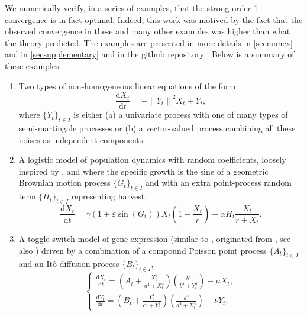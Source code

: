 \documentclass[reqno,12pt]{amsart}
\theoremstyle{plain} %
\theoremstyle{definition} %
\begin{document}
We numerically verify, in a series of examples, that the strong order 1 convergence is in fact optimal. Indeed, this work was motived by the fact that the observed convergence in these and many other examples was higher than what the theory predicted. The examples are presented in more details in \cref{secnumex} and in \cref{secsupplementary} and in the github repository \cite{RODEConvEM2023}. Below is a summary of these examples:
\begin{enumerate}
    \item Two types of non-homogeneous linear equations of the form
    \begin{equation}
        \label{allnoisesRODEsystemintro}
        \frac{\mathrm{d}X_t}{\mathrm{d} t} = - \left\|Y_t\right\|^2 X_t + Y_t,
    \end{equation} 
    where $\{Y_t\}_{t\in I}$ is either (a) a univariate process with one of many types of semi-martingale processes or (b) a vector-valued process combining all these noises as independent components.
    \item A logistic model of population dynamics with random coefficients, loosely inspired by \cite[Section 15.2]{HanKloeden2017}, and where the specific growth is the sine of a geometric Brownian motion process $\{G_t\}_{t\in I}$ and with an extra point-process random term $\{H_t\}_{t\in I}$ representing harvest:
    \begin{equation}
        \label{eqpopdyn}
        \frac{\mathrm{d}X_t}{\mathrm{d}t} = \gamma (1 + \varepsilon \sin(G_t)) X_t (1 - \frac{X_t}{r}) - \alpha H_t \frac{X_t}{r + X_t}.
    \end{equation}
    \item A toggle-switch model of gene expression (similar to \cite[Section 7.8]{Asai2016}, originated from \cite{VerdCrombachJaeger2014}, see also \cite{StrasserTheisMarr2012}) driven by a combination of a compound Poisson point process $\{A_t\}_{t\in I}$ and an It\^o diffusion process $\{B_t\}_{t\in I},$
    \begin{equation}
        \label{toggleswitchsystemintro}
        \begin{cases}
            \frac{\displaystyle \mathrm{d}X_t}{\displaystyle \mathrm{d} t} = \left( A_t + \frac{\displaystyle X_t^4}{\displaystyle a^4 + X_t^4}\right)\left(\frac{\displaystyle b^4}{\displaystyle b^4 + Y_t^4}\right) - \mu X_t, \\
            \frac{\displaystyle \mathrm{d}Y_t}{\displaystyle \mathrm{d} t} = \left( B_t + \frac{\displaystyle Y_t^4}{\displaystyle c^4 + Y_t^4}\right)\left(\frac{\displaystyle d^4}{\displaystyle d^4 + X_t^4}\right) - \nu Y_t.

\end{cases}
\end{equation}
\end{enumerate}
\end{document}
